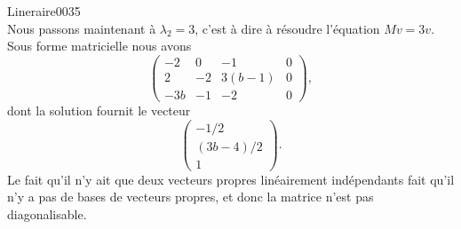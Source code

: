 \begin{corrige}{Lineraire0035}
\begin{equation}
	\end{equation}
	Nous passons maintenant à $\lambda_2=3$, c'est à dire à résoudre l'équation $Mv=3v$. Sous forme matricielle nous avons
	\begin{equation}
		\left(\begin{array}{ccc|c}
			 -2	&	0	&	-1	&	0	\\
			  2	&	-2	&	3(b-1)	&	0\\
			   -3b	&	-1	&	-2	&	0	 
		   \end{array}\right),
	\end{equation}
	dont la solution fournit le vecteur
	\begin{equation}
		\begin{pmatrix}
			-1/2	\\ 
			(3b-4)/2	\\ 
			1	
		\end{pmatrix}.
	\end{equation}
	Le fait qu'il n'y ait que deux vecteurs propres linéairement indépendants fait qu'il n'y a pas de bases de vecteurs propres, et donc la matrice n'est pas diagonalisable.

\end{corrige}
